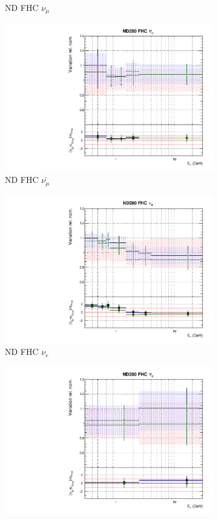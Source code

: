 \begin{figure}
\begin{subfigure}{0.45\textwidth}
  \caption{ND FHC $\nu_{\mu}$}
\end{subfigure}
\begin{subfigure}{0.45\textwidth}
  \centering
  \includegraphics[width=0.75\linewidth]{figs/newolddatafitsflux_1}
  \caption{ND FHC $\bar{\nu_{\mu}}$}
\end{subfigure}
\begin{subfigure}{0.45\textwidth}
  \centering
  \includegraphics[width=0.75\linewidth]{figs/newolddatafitsflux_2}
  \caption{ND FHC $\nu_e$}
\end{subfigure}
\begin{subfigure}{0.45\textwidth}
  \centering
  \includegraphics[width=0.75\linewidth]{figs/newolddatafitsflux_3}

\end{subfigure}
\end{figure}
